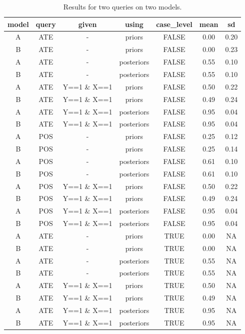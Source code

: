\documentclass[
  11pt,
  article]{jss}
\begin{document}
\begin{longtable}[t]{ccccccc}

\caption{\label{tbl-batch-query}Results for two queries on two models.}

\tabularnewline

\toprule
model & query & given & using & case\_level & mean & sd\\
\midrule
A & ATE & - & priors & FALSE & 0.00 & 0.20\\
B & ATE & - & priors & FALSE & 0.00 & 0.23\\
A & ATE & - & posteriors & FALSE & 0.55 & 0.10\\
B & ATE & - & posteriors & FALSE & 0.55 & 0.10\\
A & ATE & Y==1 \& X==1 & priors & FALSE & 0.50 & 0.22\\
\addlinespace
B & ATE & Y==1 \& X==1 & priors & FALSE & 0.49 & 0.24\\
A & ATE & Y==1 \& X==1 & posteriors & FALSE & 0.95 & 0.04\\
B & ATE & Y==1 \& X==1 & posteriors & FALSE & 0.95 & 0.04\\
A & POS & - & priors & FALSE & 0.25 & 0.12\\
B & POS & - & priors & FALSE & 0.25 & 0.14\\
\addlinespace
A & POS & - & posteriors & FALSE & 0.61 & 0.10\\
B & POS & - & posteriors & FALSE & 0.61 & 0.10\\
A & POS & Y==1 \& X==1 & priors & FALSE & 0.50 & 0.22\\
B & POS & Y==1 \& X==1 & priors & FALSE & 0.49 & 0.24\\
A & POS & Y==1 \& X==1 & posteriors & FALSE & 0.95 & 0.04\\
\addlinespace
B & POS & Y==1 \& X==1 & posteriors & FALSE & 0.95 & 0.04\\
A & ATE & - & priors & TRUE & 0.00 & NA\\
B & ATE & - & priors & TRUE & 0.00 & NA\\
A & ATE & - & posteriors & TRUE & 0.55 & NA\\
B & ATE & - & posteriors & TRUE & 0.55 & NA\\
\addlinespace
A & ATE & Y==1 \& X==1 & priors & TRUE & 0.50 & NA\\
B & ATE & Y==1 \& X==1 & priors & TRUE & 0.49 & NA\\
A & ATE & Y==1 \& X==1 & posteriors & TRUE & 0.95 & NA\\
B & ATE & Y==1 \& X==1 & posteriors & TRUE & 0.95 & NA\\

\end{longtable}
\end{document}
